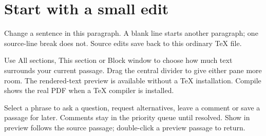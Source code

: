 \section{Start with a small edit}\label{sec:start}
Change a sentence in this paragraph. A blank line starts another paragraph;
one source-line break does not. Source edits save back to this ordinary TeX file.

Use All sections, This section or Block window to choose how much text surrounds
your current passage. Drag the central divider to give either pane more room.
The rendered-text preview is available without a TeX installation. Compile shows
the real PDF when a TeX compiler is installed.

Select a phrase to ask a question, request alternatives, leave a comment or save
a passage for later. Comments stay in the priority queue until resolved. Show in
preview follows the source passage; double-click a preview passage to return.
